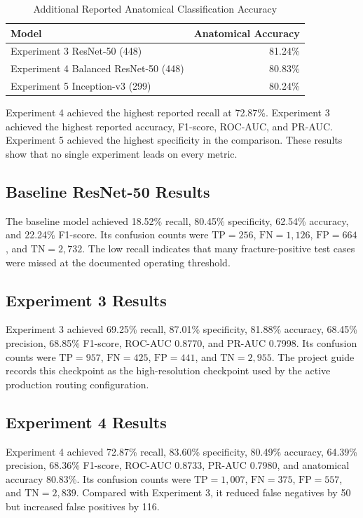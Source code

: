 \documentclass{article}
\begin{document}
\begin{table}[htbp]
\centering
\caption{Additional Reported Anatomical Classification Accuracy}
\label{tab:anatomical_accuracy}
\begin{tabular}{lr}
\toprule
\textbf{Model} & \textbf{Anatomical Accuracy} \\
\midrule
Experiment 3 ResNet-50 (448) & 81.24\% \\
Experiment 4 Balanced ResNet-50 (448) & 80.83\% \\
Experiment 5 Inception-v3 (299) & 80.24\% \\
\bottomrule
\end{tabular}
\end{table}

Experiment 4 achieved the highest reported recall at 72.87\%. Experiment 3 achieved the highest reported accuracy, F1-score, ROC-AUC, and PR-AUC. Experiment 5 achieved the highest specificity in the comparison. These results show that no single experiment leads on every metric.

\subsection{Baseline ResNet-50 Results}
The baseline model achieved 18.52\% recall, 80.45\% specificity, 62.54\% accuracy, and 22.24\% F1-score. Its confusion counts were $\text{TP} = 256$, $\text{FN} = 1,126$, $\text{FP} = 664$, and $\text{TN} = 2,732$. The low recall indicates that many fracture-positive test cases were missed at the documented operating threshold.

\subsection{Experiment 3 Results}
Experiment 3 achieved 69.25\% recall, 87.01\% specificity, 81.88\% accuracy, 68.45\% precision, 68.85\% F1-score, ROC-AUC 0.8770, and PR-AUC 0.7998. Its confusion counts were $\text{TP} = 957$, $\text{FN} = 425$, $\text{FP} = 441$, and $\text{TN} = 2,955$. The project guide records this checkpoint as the high-resolution checkpoint used by the active production routing configuration.

\subsection{Experiment 4 Results}
Experiment 4 achieved 72.87\% recall, 83.60\% specificity, 80.49\% accuracy, 64.39\% precision, 68.36\% F1-score, ROC-AUC 0.8733, PR-AUC 0.7980, and anatomical accuracy 80.83\%. Its confusion counts were $\text{TP} = 1,007$, $\text{FN} = 375$, $\text{FP} = 557$, and $\text{TN} = 2,839$. Compared with Experiment 3, it reduced false negatives by 50 but increased false positives by 116.
\end{document}

